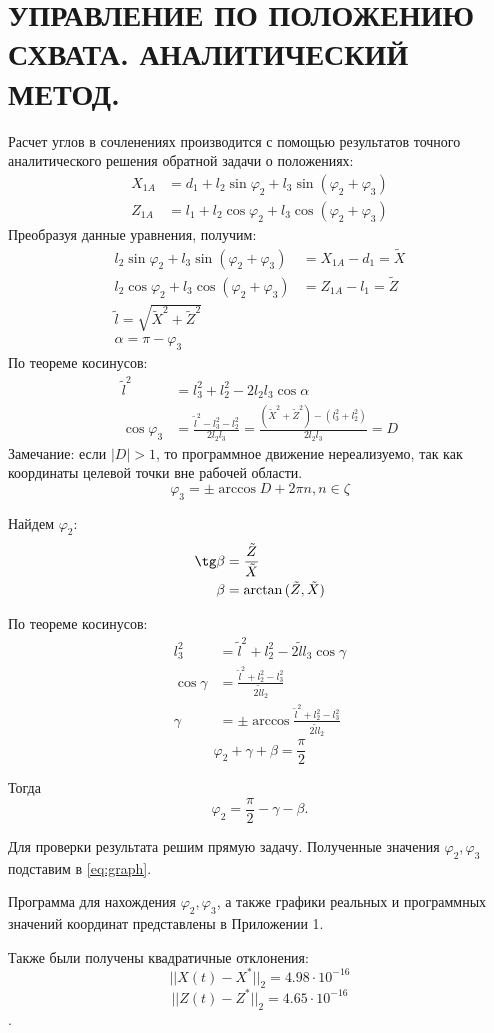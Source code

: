 \chapter{\MakeUppercase{Управление по положению схвата. Аналитический метод. }}

Расчет углов в сочленениях производится с помощью результатов точного аналитического решения обратной задачи о положениях:
\begin{align*}
    X_{1A}&=d_1+l_2\sin\varphi_2+l_3\sin{(\varphi_2+\varphi_3)} \\
   Z_{1A}&=l_1+l_2\cos\varphi_2+l_3\cos{(\varphi_2+\varphi_3)} \label{eq:graph} \tag{1}
\end{align*}
Преобразуя данные уравнения, получим:
\begin{align*}
    l_2\sin\varphi_2+l_3\sin{(\varphi_2+\varphi_3)}&=X_{1A}-d_1=\tilde X \\
   l_2\cos\varphi_2+l_3\cos{(\varphi_2+\varphi_3)}&=Z_{1A}-l_1=\tilde Z \\
   \tilde l=\sqrt{\tilde X^2+\tilde Z^2} \\
   \alpha=\pi-\varphi_3
\end{align*}
По теореме косинусов:
\begin{align*}
    \tilde l^2 &= l_3^2+l_2^2-2 l_2 l_3 \cos\alpha\\ 
     \cos\varphi_3 &= \frac{\tilde l^2-l_3^2-l_2^2}{2l_2l_3}=\frac{(\tilde X^2+\tilde Z^2)-(l_3^2+l_2^2)}{2l_2l_3}=D
\end{align*}
Замечание: если $|D|>1$, то программное движение нереализуемо, так как координаты целевой точки вне рабочей области.
$$\varphi_3=\pm \arccos{D+2\pi n}, n\in\zeta$$

Найдем $\varphi_2$:
\begin{align*}
\tg\beta&=\frac{\tilde Z}{\tilde X} \\
\beta&=\arctan{(\tilde Z,\tilde X)}
\end{align*}

По теореме косинусов:
\begin{align*}
    l_3^2 &= \tilde l^2+l_2^2-2\tilde l l_3 \cos\gamma \\
    \cos\gamma &= \frac{\tilde l^2+l_2^2-l_3^2}{2\tilde l l_2} \\
    \gamma &=\pm \arccos\frac{\tilde l^2+l_2^2-l_3^2}{2\tilde l l_2}
\end{align*}
$$\varphi_2+\gamma+\beta=\frac\pi 2$$ 

Тогда $$\varphi_2=\frac \pi 2 -\gamma-\beta.$$

Для проверки результата решим прямую задачу. Полученные значения $\varphi_2,\varphi_3$ подставим в \eqref{eq:graph}. 

Программа для нахождения $\varphi_2,\varphi_3$, а также графики реальных и программных значений координат представлены в Приложении 1.

Также были получены квадратичные отклонения: 
$$||X(t)-X^*||_2=4.98\cdot10^{-16}$$
$$||Z(t)-Z^*||_2=4.65\cdot10^{-16}$$.